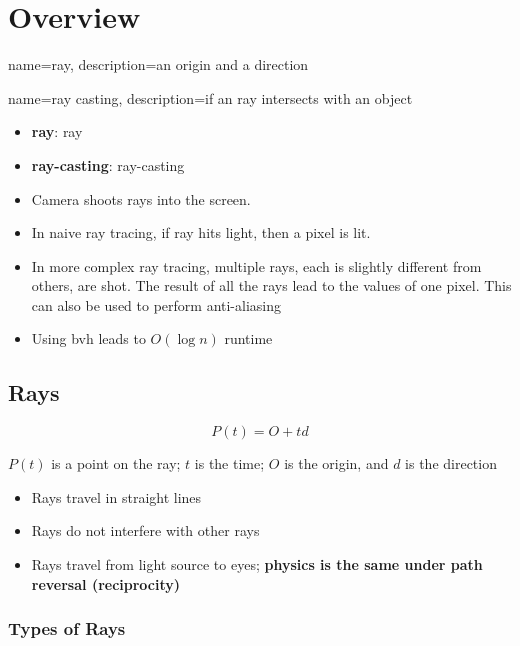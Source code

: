 \chapter{Overview}

{
  name=ray,
  description={an origin and a direction}
}

{
  name=ray casting,
  description={if an ray intersects with an object}
}


\begin{itemize}
  \item \textbf{\Gls{ray}}: \Glsdesc{ray}
  \item \textbf{\Gls{ray-casting}}: \Glsdesc{ray-casting}
  \item Camera shoots rays into the screen.
  \item In naive ray tracing, if ray hits light, then a pixel is lit.
  \item In more complex ray tracing, multiple rays, each is slightly different
  from others, are shot. The result of all the rays lead to the values of one
  pixel. This can also be used to perform anti-aliasing
  \item Using \acrfull{bvh} leads to $ O\left( \log n \right) $ runtime
\end{itemize}

\section{Rays}

  \begin{equation}
    P\left( t \right) = O + td
  \end{equation}

  $ P\left( t \right) $ is a point on the ray; $ t $ is the time; $ O $ is
  the origin, and $ d $ is the direction

  \begin{itemize}
    \item Rays travel in straight lines
    \item Rays do not interfere with other rays
    \item Rays travel from light source to eyes; \textbf{physics is the same under
    path reversal (reciprocity)}
  \end{itemize}

  \subsection{Types of Rays}

